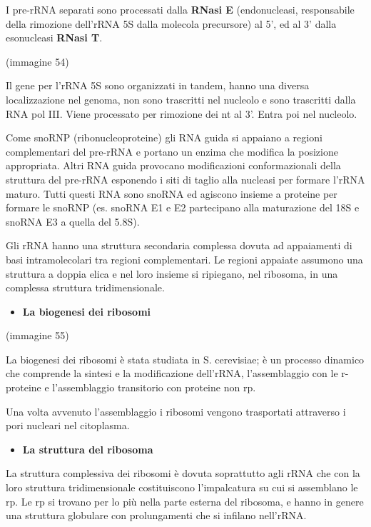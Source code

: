 \documentclass[11pt]{book}
\begin{document}
I pre-rRNA separati sono processati dalla \textbf{RNasi E}
(endonucleasi, responsabile della rimozione dell'rRNA 5S dalla molecola
precursore) al 5', ed al 3' dalla esonucleasi \textbf{RNasi T}.

(immagine 54)

Il gene per l'rRNA 5S sono organizzati in tandem, hanno una diversa
localizzazione nel genoma, non sono trascritti nel nucleolo e sono
trascritti dalla RNA pol III. Viene processato per rimozione dei nt al
3'. Entra poi nel nucleolo.

Come snoRNP (ribonucleoproteine) gli RNA guida si appaiano a regioni
complementari del pre-rRNA e portano un enzima che modifica la posizione
appropriata. Altri RNA guida provocano modificazioni conformazionali
della struttura del pre-rRNA esponendo i siti di taglio alla nucleasi
per formare l'rRNA maturo. Tutti questi RNA sono snoRNA ed agiscono
insieme a proteine per formare le snoRNP (es. snoRNA E1 e E2 partecipano
alla maturazione del 18S e snoRNA E3 a quella del 5.8S).

Gli rRNA hanno una struttura secondaria complessa dovuta ad appaiamenti
di basi intramolecolari tra regioni complementari. Le regioni appaiate
assumono una struttura a doppia elica e nel loro insieme si ripiegano,
nel ribosoma, in una complessa struttura tridimensionale.

\begin{itemize}
\itemsep1pt\parskip0pt
\item
  \textbf{La biogenesi dei ribosomi}
\end{itemize}

(immagine 55)

La biogenesi dei ribosomi è stata studiata in S. cerevisiae; è un
processo dinamico che comprende la sintesi e la modificazione dell'rRNA,
l'assemblaggio con le r-proteine e l'assemblaggio transitorio con
proteine non rp.

Una volta avvenuto l'assemblaggio i ribosomi vengono trasportati
attraverso i pori nucleari nel citoplasma.

\begin{itemize}
\itemsep1pt\parskip0pt
\item
  \textbf{La struttura del ribosoma}
\end{itemize}

La struttura complessiva dei ribosomi è dovuta soprattutto agli rRNA che
con la loro struttura tridimensionale costituiscono l'impalcatura su cui
si assemblano le rp. Le rp si trovano per lo più nella parte esterna del
ribosoma, e hanno in genere una struttura globulare con prolungamenti
che si infilano nell'rRNA.
\end{document}
